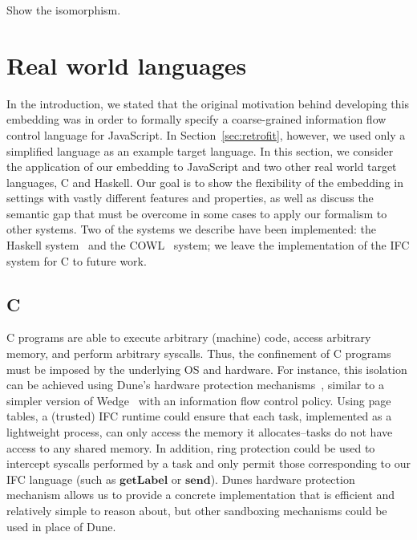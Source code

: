 \documentclass{sigplanconf}
\newcommand{\Red}[1]{{\color{red} #1}}
\begin{document}
\Red{Show the isomorphism.}



\section{Real world languages}
\label{sec:real}

In the introduction, we stated that the original motivation behind
developing this embedding was in order to formally specify a
coarse-grained information flow control language for JavaScript.
%
In Section~\ref{sec:retrofit}, however, we used only a simplified
language as an example target language.
%
In this section, we consider the application of our embedding to
JavaScript and two other real world target languages, C and Haskell.
%
Our goal is to show the flexibility of the embedding in settings with
vastly different features and properties, as well as discuss the
semantic gap that must be overcome in some cases to apply our formalism
to other systems.
%
Two of the systems we describe have been implemented: the Haskell
system~\cite{lio} and the COWL~\cite{swapi} system; we leave the
implementation of the IFC system for C to future work.

\subsection{C}
\label{sec:real:c}
%
C programs are able to execute arbitrary (machine) code, access
arbitrary memory, and perform arbitrary syscalls.
%
Thus, the confinement of C programs must be imposed by the underlying OS
and hardware.
%
For instance, this isolation can be achieved using Dune's hardware protection
mechanisms~\cite{Belay:2012:DSU:2387880.2387913}, similar to a simpler
version of Wedge~\cite{Belay:2012:DSU:2387880.2387913,
Bittau:2008:WSA:1387589.1387611} with an information flow control
policy.
%
Using page tables, a (trusted) IFC runtime could ensure that each task,
implemented as a lightweight process, can only access the memory it
allocates--tasks do not have access to any shared memory.
%
In addition, ring protection could be used to intercept syscalls performed by
a task and only permit those corresponding to our IFC language (such as
\ensuremath{\mathbf{getLabel}} or \ensuremath{\mathbf{send}}).
%
Dunes hardware protection mechanism allows us to provide a concrete
implementation that is efficient and relatively simple to reason
about, but other sandboxing mechanisms could be used in place of Dune.
\end{document}
